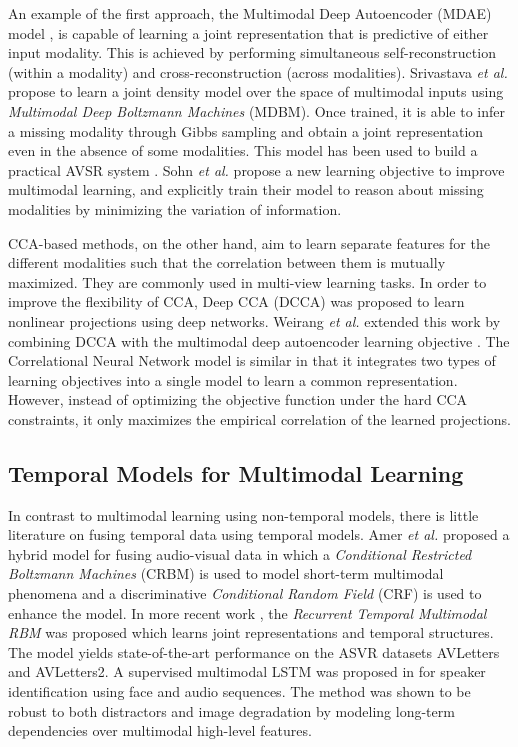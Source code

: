 \documentclass[10pt,twocolumn,letterpaper]{article}
\begin{document}
An example of the first approach, the Multimodal Deep Autoencoder (MDAE) model \cite{ngiam2011multimodal}, is capable of learning a joint representation that is predictive of either input modality. This is achieved by performing simultaneous self-reconstruction (within a modality) and cross-reconstruction (across modalities). Srivastava \textit{et al.} \cite{srivastava2012multimodal} propose to learn a joint density model over the space of multimodal inputs using \textit{Multimodal Deep Boltzmann Machines} (MDBM). Once trained, it is able to infer a missing modality through Gibbs sampling and obtain a joint representation even in the absence of some modalities. This model has been used to build a practical AVSR system \cite{sui2015listening}. Sohn \textit{et al.} \cite{sohn2014improved} propose a new learning objective to improve multimodal learning, and explicitly train their model to reason about missing modalities by minimizing the variation of information.

CCA-based methods, on the other hand, aim to learn separate features for the different modalities such that the correlation between them is mutually maximized. They are commonly used in multi-view learning tasks. In order to improve the flexibility of CCA, Deep CCA (DCCA) \cite{andrew2013deep} was proposed to learn nonlinear projections using deep networks. Weirang \textit{et al.} \cite{wang2015deep} extended this work by combining DCCA with the multimodal deep autoencoder learning objective \cite{ngiam2011multimodal}. The Correlational Neural Network model \cite{chandar2015correlational} is similar in that it integrates two types of learning objectives into a single model to learn a common representation. However, instead of optimizing the objective function under the hard CCA constraints, it only maximizes the empirical correlation of the learned projections.



\subsection{Temporal Models for Multimodal Learning}

In contrast to multimodal learning using non-temporal models, there is little literature on fusing temporal data using temporal models. Amer \textit{et al.} \cite{amer2014multimodal} proposed a hybrid model for fusing audio-visual data in which a \textit{Conditional Restricted Boltzmann Machines} (CRBM) is used to model short-term multimodal phenomena and a discriminative \textit{Conditional Random Field} (CRF) is used to enhance the model. In more recent work \cite{hu2016temporal}, the \textit{Recurrent Temporal Multimodal RBM} was proposed which learns joint representations and temporal structures. The model yields state-of-the-art performance on the ASVR datasets AVLetters and AVLetters2. A supervised multimodal LSTM was proposed in \cite{ren2016look} for speaker identification using face and audio sequences. The method was shown to be robust to both distractors and image degradation by modeling long-term dependencies over multimodal high-level features.
\end{document}
